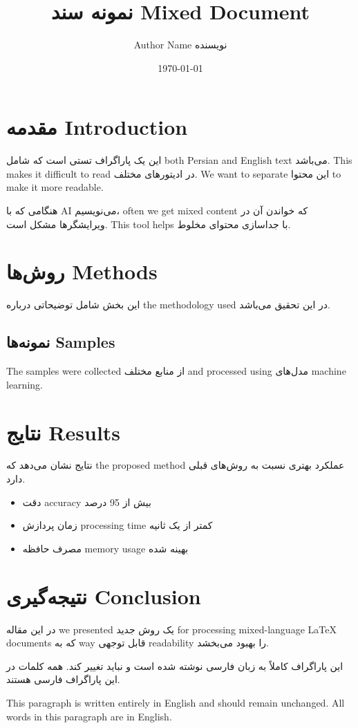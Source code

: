 \documentclass{article}
\begin{document}
\title{نمونه سند Mixed Document}
\author{Author Name نویسنده}
\date{\today}

\maketitle

\section{مقدمه Introduction}

این یک پاراگراف تستی است که شامل both Persian and English text می‌باشد. This makes it difficult to read در ادیتورهای مختلف. We want to separate این محتوا to make it more readable.

هنگامی که با AI می‌نویسیم، often we get mixed content که خواندن آن در ویرایشگرها مشکل است. This tool helps با جداسازی محتوای مخلوط.

\section{روش‌ها Methods}

این بخش شامل توضیحاتی درباره the methodology used در این تحقیق می‌باشد.

\subsection{نمونه‌ها Samples}

The samples were collected از منابع مختلف and processed using مدل‌های machine learning.

\section{نتایج Results}

نتایج نشان می‌دهد که the proposed method عملکرد بهتری نسبت به روش‌های قبلی دارد.

\begin{itemize}
    \item دقت accuracy بیش از 95 درصد
    \item زمان پردازش processing time کمتر از یک ثانیه
    \item مصرف حافظه memory usage بهینه شده
\end{itemize}

\section{نتیجه‌گیری Conclusion}

در این مقاله we presented یک روش جدید for processing mixed-language LaTeX documents که به way قابل توجهی readability را بهبود می‌بخشد.

این پاراگراف کاملاً به زبان فارسی نوشته شده است و نباید تغییر کند. همه کلمات در این پاراگراف فارسی هستند.

This paragraph is written entirely in English and should remain unchanged. All words in this paragraph are in English.
\end{document}
